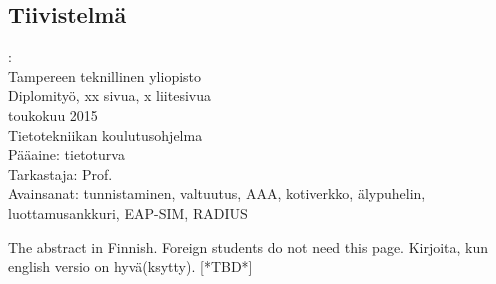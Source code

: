 \documentclass[12pt,a4paper,english]{tutthesis}
\begin{document}
\begin{otherlanguage}{finnish} %
\chapter*{Tiivistelmä}         %

\begin{spacing}{1.0}
         {\bf \textsf{\MakeUppercase{\@author}}}: \@titleB\\  %
         \textsf{Tampereen teknillinen yliopisto}\\
         \textsf{Diplomityö, xx sivua, x liitesivua}\\ %
         \textsf{toukokuu 2015}\\
         \textsf{Tietotekniikan koulutusohjelma}\\
         \textsf{Pääaine: tietoturva}\\
         \textsf{Tarkastaja:  Prof. \@examiner}\\ %
         \textsf{Avainsanat: tunnistaminen, valtuutus, AAA, kotiverkko, älypuhelin, luottamusankkuri, EAP-SIM, RADIUS}\\
\end{spacing}
The abstract in Finnish. Foreign students do not need this page.
Kirjoita, kun english versio on hyvä(ksytty).
[*TBD*]
\end{otherlanguage} %
\end{document}

